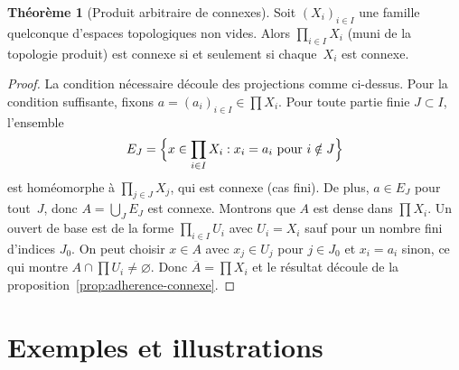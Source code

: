 \documentclass[12pt,a4paper,openany]{book}
\theoremstyle{definition}
\theoremstyle{cours}
\newtheorem{theoreme}{Théorème}[chapter]
\theoremstyle{coursnormal}
\begin{document}
\begin{theoreme}[Produit arbitraire de connexes]
\label{thm:produit-arbitraire-connexes}
Soit $(X_i)_{i \in I}$ une famille quelconque d'espaces topologiques non vides.
Alors $\prod_{i \in I} X_i$ (muni de la topologie produit) est connexe si et
seulement si chaque~$X_i$ est connexe.
\end{theoreme}

\begin{proof}
La condition nécessaire découle des projections comme ci-dessus. Pour la condition
suffisante, fixons $a = (a_i)_{i \in I} \in \prod X_i$. Pour toute partie finie
$J \subset I$, l'ensemble
\[
E_J = \Bigl\{ x \in \prod_{i \in I} X_i : x_i = a_i \text{ pour } i \notin J \Bigr\}
\]
est homéomorphe à $\prod_{j \in J} X_j$, qui est connexe (cas fini). De plus,
$a \in E_J$ pour tout~$J$, donc $A = \bigcup_J E_J$ est connexe. Montrons que
$A$ est dense dans $\prod X_i$. Un ouvert de base est de la forme
$\prod_{i \in I} U_i$ avec $U_i = X_i$ sauf pour un nombre fini d'indices
$J_0$. On peut choisir $x \in A$ avec $x_j \in U_j$ pour $j \in J_0$ et $x_i = a_i$
sinon, ce qui montre $A \cap \prod U_i \neq \varnothing$. Donc $\overline{A} = \prod X_i$
et le résultat découle de la proposition~\ref{prop:adherence-connexe}.
\end{proof}

\section{Exemples et illustrations}
\label{sec:exemples-connexite}

\begin{center}
\end{center}
\end{document}
